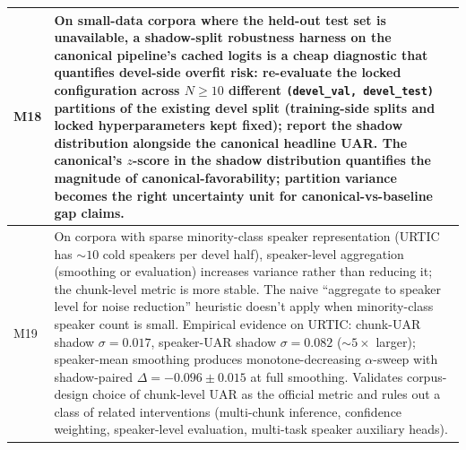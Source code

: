 \begin{table}[t]
\begin{tabular}{lp{}}
\midrule
M18 & On small-data corpora where the held-out test set is unavailable, a shadow-split robustness harness on the canonical pipeline's cached logits is a cheap diagnostic that quantifies devel-side overfit risk: re-evaluate the locked configuration across $N \geq 10$ different \texttt{(devel\_val, devel\_test)} partitions of the existing devel split (training-side splits and locked hyperparameters kept fixed); report the shadow distribution alongside the canonical headline UAR. The canonical's $z$-score in the shadow distribution quantifies the magnitude of canonical-favorability; partition variance becomes the right uncertainty unit for canonical-vs-baseline gap claims. \\
\midrule
M19 & On corpora with sparse minority-class speaker representation (URTIC has $\sim 10$ cold speakers per devel half), speaker-level aggregation (smoothing or evaluation) increases variance rather than reducing it; the chunk-level metric is more stable. The naive ``aggregate to speaker level for noise reduction'' heuristic doesn't apply when minority-class speaker count is small. Empirical evidence on URTIC: chunk-UAR shadow $\sigma {=} 0.017$, speaker-UAR shadow $\sigma {=} 0.082$ ($\sim 5\times$ larger); speaker-mean smoothing produces monotone-decreasing $\alpha$-sweep with shadow-paired $\Delta {=} -0.096 \pm 0.015$ at full smoothing. Validates corpus-design choice of chunk-level UAR as the official metric and rules out a class of related interventions (multi-chunk inference, confidence weighting, speaker-level evaluation, multi-task speaker auxiliary heads). \\
\bottomrule
\end{tabular}
\end{table}
